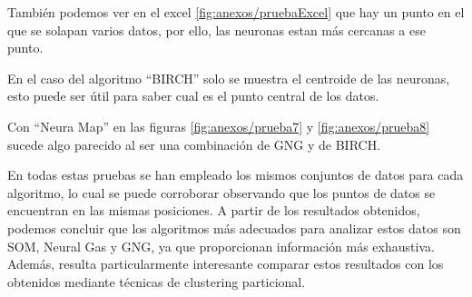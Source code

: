 
También podemos ver en el excel \ref{fig:anexos/pruebaExcel} que hay un punto en el que se solapan varios datos, por ello, las neuronas estan más cercanas a ese punto.


En el caso del algoritmo ``BIRCH'' solo se muestra el centroide de las neuronas, esto puede ser útil para saber cual es el punto central de los datos.


Con ``Neura Map'' en las figuras \ref{fig:anexos/prueba7} y \ref{fig:anexos/prueba8} sucede algo parecido al ser una combinación de GNG y de BIRCH.


En todas estas pruebas se han empleado los mismos conjuntos de datos para cada algoritmo, lo cual se puede corroborar observando que los puntos de datos se encuentran en las mismas posiciones. A partir de los resultados obtenidos, podemos concluir que los algoritmos más adecuados para analizar estos datos son SOM, Neural Gas y GNG, ya que proporcionan información más exhaustiva. Además, resulta particularmente interesante comparar estos resultados con los obtenidos mediante técnicas de clustering particional.